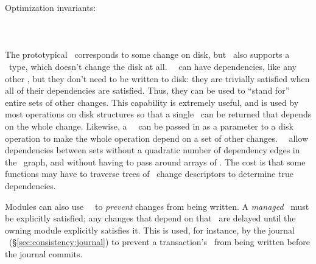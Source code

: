 \noindent Optimization invariants:






\paragraph{\Noop\ \ChDescs}
\label{sec:design:chdescs:noop}

The prototypical \chdesc\ corresponds to some change on disk, but \Kudos\
 also supports a \emph{\noop} \chdesc\ type, which doesn't change the disk
 at all.
%
%
\Noop\ \chdescs\ can have dependencies, like any other
\chdesc, but they don't need to be written to disk:  they are trivially satisfied when all of their dependencies are
satisfied.
%
Thus, they can be used to ``stand for'' entire sets of other changes.
%
This capability is extremely useful, and is used by most operations on disk
structures so that a single \chdesc\ can be returned that depends on the whole
change. Likewise, a \noop\ \chdesc\ can be passed in as a parameter to a disk
operation to make the whole operation depend on a set of other changes. \Noop\
\chdescs\ allow dependencies between sets without a quadratic number
of dependency edges in the \chdesc\ graph, and without having to pass around
arrays of \chdescs.
%
The cost is that some functions may have to traverse trees of \noop\ change
 descriptors to determine true dependencies.

Modules can also use \noop\ \chdescs\ to \emph{prevent} changes from being
 written.
%
A \emph{managed} \noop\ must be explicitly satisfied; any changes that
 depend on that \noop\ are delayed until the owning module explicitly
 satisfies it.
%
This is used, for instance, by the journal \module\
 (\S\ref{sec:consistency:journal}) to prevent a transaction's \chdescs\
 from being written before the journal commits.

